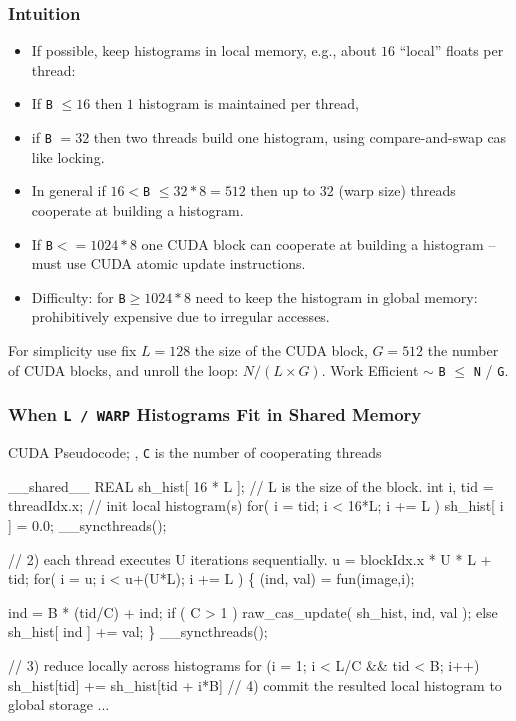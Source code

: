 \documentclass{beamer}
\renewcommand{\emph}[1]{\textcolor{structure}{#1}}
\newcommand{\emp}[1]{\textcolor{DikuRed}{ #1}}
\begin{document}
\begin{frame}[fragile,t]
  \frametitle{Intuition}
  
\begin{itemize}
    \item If possible, keep histograms in local memory, 
            e.g., about $16$ ``local'' floats per thread:\bigskip
    \item If {\tt B} $\leq 16$ then $1$ histogram is maintained per thread,
    \item if {\tt B} $= 32$ then two threads build one histogram,
            using compare-and-swap {\sc cas} like locking.\bigskip
    \item In general if $16 <${\tt B} $\leq 32*8 = 512$ then up to $32$ (warp size)
            threads cooperate at building a histogram.\bigskip
    \item If {\tt B}$<=1024*8$ one CUDA block can cooperate at building
            a histogram -- must use CUDA atomic update instructions.\bigskip
    \item \emp{Difficulty:} for {\tt B}$\geq 1024*8$ need to keep the 
            histogram in global memory: prohibitively expensive
            due to irregular accesses.
\end{itemize}   


For simplicity use fix $L = 128$ the size of the CUDA block,
$G = 512$ the number of CUDA blocks, and unroll the loop: $N / (L\times G)$.
Work Efficient $\sim$ {\tt B} $ \leq $ {\tt N} / {\tt G}.
  
\end{frame}


\begin{frame}[fragile,t]
  \frametitle{ When {\tt L / WARP} Histograms Fit in Shared Memory }

\begin{block}{ CUDA Pseudocode; {\tt }, {\tt C} is the number of cooperating threads}
\begin{colorcode}[fontsize=\scriptsize]
\emph{__shared__ REAL sh_hist[ 16 * L ];} // L is the size of the block.
int i, tid = threadIdx.x;
// \emp{init local histogram(s)}
for( i = tid; i < 16*L; i += L ) sh_hist[ i ] = 0.0;  
__syncthreads();

// \emp{2) each thread executes U iterations sequentially.}
u = blockIdx.x * U * L + tid; 
for( i = u; i < u+(U*L); i += L ) \{
    (ind, val) = fun(image,i);

    \alert{ind = B * (tid/C) + ind;}  
    if ( C > 1 )
         \emph{raw_cas_update( sh_hist, ind, val );}
    else \emph{sh_hist[ ind ] += val;}
\}  __syncthreads();

// \emp{3) reduce locally across histograms}
\alert{for (i = 1; i < L/C && tid < B; i++)}
  \alert{sh_hist[tid] += sh_hist[tid + i*B]}
// \emp{4) commit the resulted local histogram to global storage } ...
\end{colorcode}
\end{block} 
\end{frame}
\end{document}
